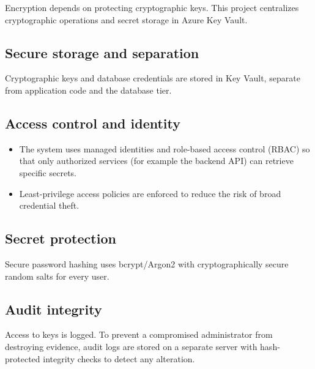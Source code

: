 Encryption depends on protecting cryptographic keys. This project centralizes cryptographic operations and secret storage in Azure Key Vault.

\subsection*{Secure storage and separation}

Cryptographic keys and database credentials are stored in Key Vault, separate from application code and the database tier.

\subsection*{Access control and identity}

\begin{itemize}
  \item The system uses managed identities and role-based access control (RBAC) so that only authorized services (for example the backend API) can retrieve specific secrets.
  \item Least-privilege access policies are enforced to reduce the risk of broad credential theft.
\end{itemize}

\subsection*{Secret protection}

Secure password hashing uses bcrypt/Argon2 with cryptographically secure random salts for every user.

\subsection*{Audit integrity}

Access to keys is logged. To prevent a compromised administrator from destroying evidence, audit logs are stored on a separate server with hash-protected integrity checks to detect any alteration.
